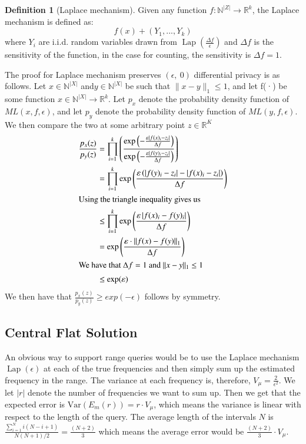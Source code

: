 \documentclass[11pt]{article}
\theoremstyle{definition}
\newtheorem{definition}{Definition}[section]
\begin{document}
\begin{definition}[Laplace mechanism]
Given any function $f:\mathbb{N}^{|Z|}\rightarrow \mathbb{R}^k$, the Laplace mechanism is defined as: \[f(x) + (Y_1,...,Y_k)\]
where $Y_i$ are i.i.d. random variables drawn from $\operatorname{Lap}(\frac{\Delta f}{\epsilon})$ and $\Delta f$ is the sensitivity of the function, in the case for counting, the sensitivity is $\Delta f=1$.
\end{definition}
The proof for Laplace mechanism preserves $(\epsilon, \ 0)$ differential privacy is as follows.
Let $x\in\mathbb{N}^{|X|}$ and$y\in\mathbb{N}^{|X|}$ be such that  $\lVert x-y\rVert_1\leq 1$, and let f(·) be some function $x\in\mathbb{N}^{|X|}\rightarrow \mathbb{R}^{k}$. Let $p_x$ denote the probability density function of $ML(x,f,\epsilon)$, and let $p_y$ denote the probability density function of $ML(y,f,\epsilon)$. We then compare the two at some arbitrary point $z\in\mathbb{R}^{K}$
\begin{align*}
\frac{p_{x}(z)}{p_{y}(z)} &=\prod_{i=1}^{k}\left(\frac{\exp \left(-\frac{\varepsilon\left|f(x)_{i}-z_{i}\right|}{\Delta f}\right)}{\exp \left(-\frac{\varepsilon\left|f(y)_{i}-z_{i}\right|}{\Delta f}\right)}\right) \\
&=\prod_{i=1}^{k} \exp \left(\frac{\varepsilon\left(\left|f(y)_{i}-z_{i}\right|-\left|f(x)_{i}-z_{i}\right|\right)}{\Delta f}\right) \\
\intertext{Using the triangle inequality gives us }
& \leq \prod_{i=1}^{k} \exp \left(\frac{\varepsilon\left|f(x)_{i}-f(y)_{i}\right|}{\Delta f}\right) \\
&=\exp \left(\frac{\varepsilon \cdot\|f(x)-f(y)\|_{1}}{\Delta f}\right) \\
\intertext{We have that $\Delta f = 1$ and $\lVert x-y\rVert_1\leq 1$  }
& \leq \exp (\varepsilon) 
\end{align*}
We then have that $\frac{p_x(z)}{p_y(z)}\geq exp(-\epsilon)$ follows by symmetry.



\subsection{Central Flat Solution}\label{teo_cen_flat}
An obvious way to support range queries would be to use the Laplace mechanism $\operatorname{Lap}(\epsilon)$ at each of the true frequencies and then simply sum up the estimated frequency in the range. The variance at each frequency is, therefore, $V_\mu=\frac{2}{\epsilon^2}$. We let $|r|$ denote the number of frequencies we want to sum up. Then we get that the expected error is $\mathrm{Var}(E_m (r))=r\cdot V_\mu$, which means the variance is linear with respect to the length of the query. The average length of the intervals $N$ is $\frac{\sum_{i=1}^{N} i(N-i+1)}{N(N+1) / 2}=\frac{(N+2)}{3}$ which means the average error would be $\frac{(N+2)}{3}\cdot V_\mu$.
\end{document}
